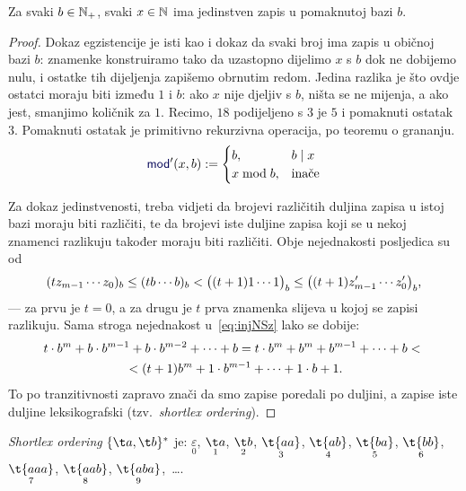 \begin{lema}[{name=[egzistencija i jedinstvenost zapisa u pomaknutoj bazi]}]\label{lm:pomakbaza}
Za svaki $b\in{\mathbb N}_+$, svaki $x\in{\mathbb N}$ ima jedinstven zapis u pomaknutoj bazi $b$.
\end{lema}
\begin{proof}
Dokaz egzistencije je isti kao i dokaz da svaki broj ima zapis u običnoj bazi $b$: znamenke konstruiramo tako da uzastopno dijelimo $x$ s $b$ dok ne dobijemo nulu, i ostatke tih dijeljenja zapišemo obrnutim redom. Jedina razlika je što ovdje ostatci moraju biti između $1$ i $b$: ako $x$ nije djeljiv s $b$, ništa se ne mijenja, a ako jest, smanjimo količnik za $1$. Recimo, $18$ podijeljeno s $3$ je $5$ i pomaknuti ostatak $3$. Pomaknuti ostatak je primitivno rekurzivna operacija, po teoremu o grananju.
\begin{equation}
    \f{mod}'(x,b):=\begin{cases}
        b,&b\mid x\\
        x\bmod b,&\text{inače}
    \end{cases}
\end{equation}

Za dokaz jedinstvenosti, treba vidjeti da brojevi različitih duljina zapisa u istoj bazi moraju biti različiti, te da brojevi iste duljine zapisa koji se u nekoj znamenci razlikuju također moraju biti različiti. Obje nejednakosti posljedica su od
\begin{equation}
\label{eq:injNSz}
    (tz_{m-1}\dotsm z_0)_b\le
    (tb\dotsm b)_b<
    \bigl((t+1)1\dotsm1\bigr)_b\le
    \bigl((t+1)z_{m-1}'\dotsm z_0'\bigr)_b\text,
\end{equation}
--- za prvu je $t=0$, a za drugu je $t$ prva znamenka slijeva u kojoj se zapisi razlikuju. Sama stroga nejednakost u~\eqref{eq:injNSz} lako se dobije:
\begin{multline}
    t\cdot b^m+b\cdot b^{m-1}+b\cdot b^{m-2}+\dotsb+b=
    t\cdot b^m+b^m+b^{m-1}+\dotsb+b<{}\\
    {}<(t+1)b^m+1\cdot b^{m-1}+\dotsb+1\cdot b+1\text.
\end{multline}
To po tranzitivnosti zapravo znači da smo zapise poredali po duljini, a zapise iste duljine leksikografski (tzv.\ \emph{shortlex ordering}).
\end{proof}

\begin{primjer}[{name=[\emph{shortlex ordering} svih riječi nad dvočlanom abecedom]}]
\emph{Shortlex ordering} $\{\t a,\t b\}^*$ je: $\underset{0}{\varepsilon}$, 
$\underset{1}{\t a}$, 
$\underset{2}{\t b}$, 
$\underset{3}{\t{aa}}$, 
$\underset{4}{\t{ab}}$,
$\underset{5}{\t{ba}}$, 
$\underset{6}{\t{bb}}$,
$\underset{7}{\t{aaa}}$,
$\underset{8}{\t{aab}}$,
$\underset{9}{\t{aba}}$,~\ldots.
\end{primjer}

